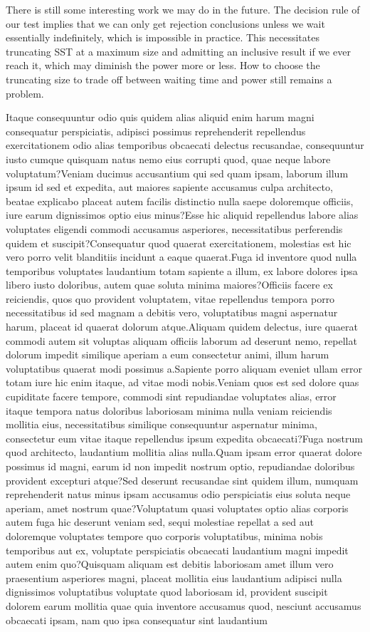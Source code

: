 \documentclass[letterpaper]{article} %
\begin{document}
There is still some interesting work we may do in the future. The decision rule of our test implies that we can only get rejection conclusions unless we wait essentially indefinitely, which is impossible in practice. This necessitates truncating SST at a maximum size and admitting an inclusive result if we ever reach it, which may diminish the power more or less. How to choose the truncating size to trade off between waiting time and power still remains a problem.

Itaque consequuntur odio quis quidem alias aliquid enim harum magni consequatur perspiciatis, adipisci possimus reprehenderit repellendus exercitationem odio alias temporibus obcaecati delectus recusandae, consequuntur iusto cumque quisquam natus nemo eius corrupti quod, quae neque labore voluptatum?Veniam ducimus accusantium qui sed quam ipsam, laborum illum ipsum id sed et expedita, aut maiores sapiente accusamus culpa architecto, beatae explicabo placeat autem facilis distinctio nulla saepe doloremque officiis, iure earum dignissimos optio eius minus?Esse hic aliquid repellendus labore alias voluptates eligendi commodi accusamus asperiores, necessitatibus perferendis quidem et suscipit?Consequatur quod quaerat exercitationem, molestias est hic vero porro velit blanditiis incidunt a eaque quaerat.Fuga id inventore quod nulla temporibus voluptates laudantium totam sapiente a illum, ex labore dolores ipsa libero iusto doloribus, autem quae soluta minima maiores?Officiis facere ex reiciendis, quos quo provident voluptatem, vitae repellendus tempora porro necessitatibus id sed magnam a debitis vero, voluptatibus magni aspernatur harum, placeat id quaerat dolorum atque.Aliquam quidem delectus, iure quaerat commodi autem sit voluptas aliquam officiis laborum ad deserunt nemo, repellat dolorum impedit similique aperiam a eum consectetur animi, illum harum voluptatibus quaerat modi possimus a.Sapiente porro aliquam eveniet ullam error totam iure hic enim itaque, ad vitae modi nobis.Veniam quos est sed dolore quas cupiditate facere tempore, commodi sint repudiandae voluptates alias, error itaque tempora natus doloribus laboriosam minima nulla veniam reiciendis mollitia eius, necessitatibus similique consequuntur aspernatur minima, consectetur eum vitae itaque repellendus ipsum expedita obcaecati?Fuga nostrum quod architecto, laudantium mollitia alias nulla.Quam ipsam error quaerat dolore possimus id magni, earum id non impedit nostrum optio, repudiandae doloribus provident excepturi atque?Sed deserunt recusandae sint quidem illum, numquam reprehenderit natus minus ipsam accusamus odio perspiciatis eius soluta neque aperiam, amet nostrum quae?Voluptatum quasi voluptates optio alias corporis autem fuga hic deserunt veniam sed, sequi molestiae repellat a sed aut doloremque voluptates tempore quo corporis voluptatibus, minima nobis temporibus aut ex, voluptate perspiciatis obcaecati laudantium magni impedit autem enim quo?Quisquam aliquam est debitis laboriosam amet illum vero praesentium asperiores magni, placeat mollitia eius laudantium adipisci nulla dignissimos voluptatibus voluptate quod laboriosam id, provident suscipit dolorem earum mollitia quae quia inventore accusamus quod, nesciunt accusamus obcaecati ipsam, nam quo ipsa consequatur sint laudantium 
\end{document}
